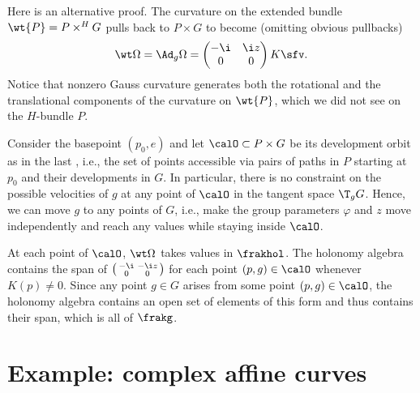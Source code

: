 Here is an alternative proof. The curvature on the extended bundle $\wt{P}=P\times^H G$ pulls back to $P\times G$ to become (omitting obvious pullbacks)
\[
    \wt\Omega=\Ad_g\Omega=\begin{pmatrix}
        -\i & \i z \\ 0 & 0
    \end{pmatrix}K\sfv.
\]
Notice that nonzero Gauss curvature generates both the rotational and the translational components of the curvature on $\wt{P}$, which we did not see on the $H$-bundle $P$.

Consider the basepoint $(p_0,e)$ and let $\calO \subset P\times G$ be its development orbit as in the last \sect, i.e., the set of points accessible via pairs of paths in $P$ starting at $p_0$ and their developments in $G$. In particular, there is no constraint on the possible velocities of $g$ at any point of $\calO$ in the tangent space $\T_g G$. Hence, we can move $g$ to any points of $G$, i.e., make the group parameters $\varphi$ and $z$ move independently and reach any values while staying inside $\calO$.

At each point of $\calO$, $\wt\Omega$ takes values in $\frakhol$. The holonomy algebra contains the span of $\left(\begin{smallmatrix}
    -\i & -\i z \\ 0 & 0
\end{smallmatrix}\right)$ for each point $(p,g)\in \calO$ whenever $K(p)\neq 0$. Since any point $g\in G$ arises from some point $(p,g)\in \calO$, the holonomy algebra contains an open set of elements of this form and thus contains their span, which is all of $\frakg$.




\section{Example: complex affine curves}

